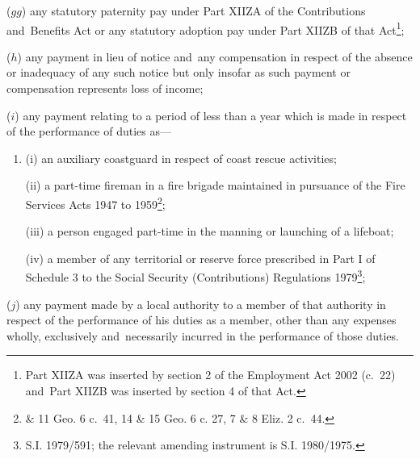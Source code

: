 \documentclass[12pt,a4paper]{article}
\begin{document}
\begin{enumerate}
($gg$) any statutory paternity pay under Part XIIZA of the Contributions and~Benefits Act or any statutory adoption pay under Part XIIZB of that Act\footnote{Part XIIZA was inserted by section 2 of the Employment Act 2002 (c.\ 22) and~Part XIIZB was inserted by section 4 of that Act.};

($h$) any payment in lieu of notice and~any compensation in respect of the absence or inadequacy of any such notice but only insofar as such payment or compensation represents loss of income;

($i$) any payment relating to a period of less than a year which is made in respect of the performance of duties as—
\begin{enumerate}\item[]
(i) an auxiliary coastguard in respect of coast rescue activities;

(ii) a part-time fireman in a fire brigade maintained in pursuance of the Fire Services Acts 1947 to 1959\footnote{ \& 11 Geo. 6 c.~41, 14 \& 15 Geo. 6 c. 27, 7 \& 8 Eliz. 2 c.~44.};

(iii) a person engaged part-time in the manning or launching of a lifeboat;

(iv) a member of any territorial or reserve force prescribed in Part I of Schedule 3 to the Social Security (Contributions) Regulations 1979\footnote{\frenchspacing S.I. 1979/591; the relevant amending instrument is S.I. 1980/1975.};
\end{enumerate}

($j$) any payment made by a local authority to a member of that authority in respect of the performance of his duties as a member, other than any expenses wholly, exclusively and~necessarily incurred in the performance of those duties.
\end{enumerate}
\end{document}
